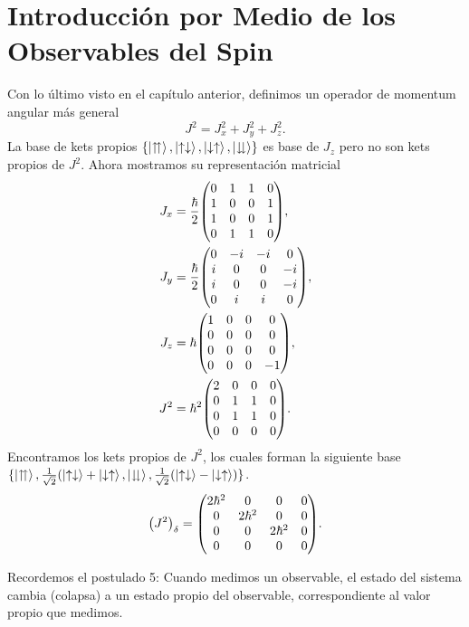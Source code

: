 \section{Introducción por Medio de los Observables del Spin}
Con lo último visto en el capítulo anterior, definimos un operador de momentum angular más general
	\begin{equation}
		J^2 = J_x ^2 + J_y ^2 + J_z ^2 .
	\end{equation}
La base de kets propios $\{ \ket{\upuparrows}, \ket{\uparrow \downarrow}, \ket{\downarrow \uparrow}, \ket{\downdownarrows} \}$ es base de $J_z$ pero no son kets propios de $J^2$. Ahora mostramos su representación matricial
\begin{align}
	J_x &= \frac{\hbar}{2} \mqty(0 & 1 & 1 & 0 \\
								 1 & 0 & 0 & 1 \\
								 1 & 0 & 0 & 1 \\
								 0 & 1 & 1 & 0), \\
	J_y &= \frac{\hbar}{2} \mqty(0 & -i & -i & 0 \\
								 i & 0 & 0 & -i \\
								 i & 0 & 0 & -i \\
								 0 & i & i & 0), \\
	J_z &= \hbar \mqty(1 & 0 & 0 & 0 \\
								 0 & 0 & 0 & 0 \\
								 0 & 0 & 0 & 0 \\
								 0 & 0 & 0 & -1), \\
	J^2 &= \hbar ^2 \mqty(2 & 0 & 0 & 0 \\
								 0 & 1 & 1 & 0 \\
								 0 & 1 & 1 & 0 \\
								 0 & 0 & 0 & 0).
\end{align}
Encontramos los kets propios de $J^2$, los cuales forman la siguiente base $\{ \ket{\upuparrows}, \frac{1}{\sqrt{2}} (\ket{\uparrow \downarrow} + \ket{\downarrow \uparrow}, \ket{\downdownarrows}, \frac{1}{\sqrt{2}} (\ket{\uparrow \downarrow} - \ket{\downarrow \uparrow}) \}$.
\begin{equation}
	\qty(J^2)_\delta = \mqty(2\hbar ^2 & 0 & 0 & 0 \\
							 0 & 2\hbar ^2 & 0 & 0 \\
							 0 & 0 & 2\hbar ^2 & 0 \\
							 0 & 0 & 0 & 0).
\end{equation}


Recordemos el postulado 5: Cuando medimos un observable, el estado del sistema cambia (colapsa) a un estado propio del observable, correspondiente al valor propio que medimos.

